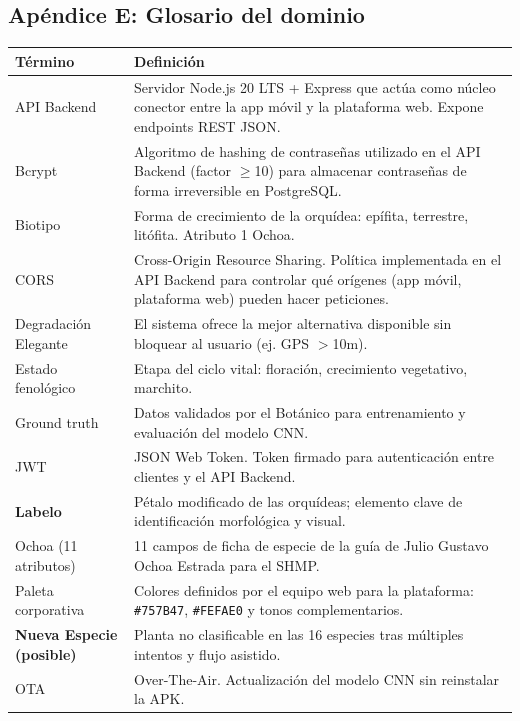 \documentclass[12pt, a4paper]{article}
\begin{document}
\subsection{Ap\'endice E: Glosario del dominio}

\begin{longtable}{|p{3.5cm}|p{11cm}|}
\hline
\textbf{T\'ermino} & \textbf{Definici\'on} \\
\hline
\endhead
API Backend & Servidor Node.js 20 LTS + Express que act\'ua como n\'ucleo conector entre la app m\'ovil y la plataforma web. Expone endpoints REST JSON. \\
\hline
Bcrypt & Algoritmo de hashing de contrase\~nas utilizado en el API Backend (factor $\geq$10) para almacenar contrase\~nas de forma irreversible en PostgreSQL. \\
\hline
Biotipo & Forma de crecimiento de la orqu\'idea: ep\'ifita, terrestre, lit\'ofita. Atributo 1 Ochoa. \\
\hline
CORS & Cross-Origin Resource Sharing. Pol\'itica implementada en el API Backend para controlar qu\'e or\'igenes (app m\'ovil, plataforma web) pueden hacer peticiones. \\
\hline
Degradaci\'on Elegante & El sistema ofrece la mejor alternativa disponible sin bloquear al usuario (ej. GPS $>$10m). \\
\hline
Estado fenol\'ogico & Etapa del ciclo vital: floraci\'on, crecimiento vegetativo, marchito. \\
\hline
Ground truth & Datos validados por el Bot\'anico para entrenamiento y evaluaci\'on del modelo CNN. \\
\hline
JWT & JSON Web Token. Token firmado para autenticaci\'on entre clientes y el API Backend. \\
\hline
\textbf{Labelo} & P\'etalo modificado de las orqu\'ideas; elemento clave de identificaci\'on morfol\'ogica y visual. \\
\hline
Ochoa (11 atributos) & 11 campos de ficha de especie de la gu\'ia de Julio Gustavo Ochoa Estrada para el SHMP. \\
\hline
Paleta corporativa & Colores definidos por el equipo web para la plataforma: \texttt{\#757B47}, \texttt{\#FEFAE0} y tonos complementarios. \\
\hline
\textbf{Nueva Especie (posible)} & Planta no clasificable en las 16 especies tras m\'ultiples intentos y flujo asistido. \\
\hline
OTA & Over-The-Air. Actualizaci\'on del modelo CNN sin reinstalar la APK. \\

\end{longtable}
\end{document}
